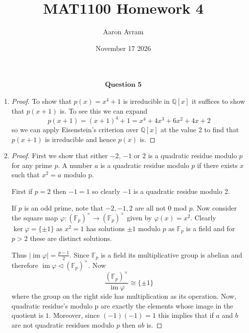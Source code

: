 \documentclass[12pt]{article}
\title{MAT1100 Homework 4}
\author{Aaron Avram}
\date{November 17 2026}
\begin{document}
\newtheorem{definition}{Definition}
\newtheorem{theorem}{Theorem}
\newtheorem{claim}{Claim}
\newtheorem{corollary}{Corollary}

\maketitle

\begin{align*}
    \textbf{Question 5}
\end{align*}

\begin{enumerate}
    \item[(i)]
    \begin{proof}
        To show that $p(x) = x^4 + 1$ is irreducible in $\mathbb Q[x]$
        it suffices to show that $p(x+1)$ is. To see this we can expand
        \[ p(x+1) = (x + 1)^4 + 1 = x^4 + 4x^3 + 6x^2 + 4x + 2 \]
        so we can apply Eisenstein's criterion over $\mathbb Q[x]$ at the value 2 to find that $p(x+1)$
        is irreducible and hence $p(x)$ is.
    \end{proof}

    \item[(ii)]
    \begin{proof}
        First we show that either $-2$, $-1$ or $2$ is a quadratic residue modulo $p$
        for any prime $p$. A number $a$ is a quadratic residue modulo $p$ if there exists $x$
        such that $x^2 = a$ modulo p.
        
        First if $p = 2$ then $-1 = 1$ so clearly $-1$ is a quadratic residue modulo 2.

        If $p$ is an odd prime, note that $-2, -1, 2$ are all not 0 mod $p$. Now consider the square map $\varphi: (\mathbb F_p)^\times \to (\mathbb F_p)^\times$
        given by $\varphi(x) = x^2$. Clearly $\ker \varphi = \{ \pm 1 \}$ as $x^2 = 1$ has solutions $\pm 1$
        modulo $p$ as $\mathbb F_p$ is a field and for $p > 2$ these are distinct solutions.

        Thus $|\operatorname{im} \varphi| = \frac{p-1}{2}$. Since $\mathbb F_p$ is a field
        its multiplicative group is abelian and therefore $\operatorname{im}\varphi \lhd (\mathbb F_p)^\times$.
        Now
        \[ \frac{(\mathbb F_p)^\times}{\operatorname{im}\varphi} \cong \{ \pm 1 \} \]
        where the group on the right side has multiplication as its operation. Now,
        quadratic residue's modulo p are exactly the elements whose image in the quotient is $1$.
        Moreover, since $(-1)(-1) = 1$ this implies that if $a$ and $b$ are not quadratic residues
        modulo $p$ then $ab$ is.


\end{proof}
\end{enumerate}
\end{document}
